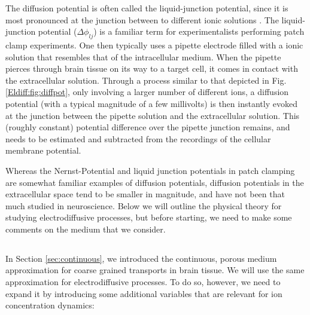 The diffusion potential is often called the liquid-junction potential, since it is most pronounced at the junction between to different ionic solutions \cite{Sokalski2001}. The liquid-junction potential ($\Delta \phi_{lj}$) is a familiar term for experimentalists performing patch clamp experiments. One then typically uses a pipette electrode filled with a ionic solution that resembles that of the intracellular medium. When the pipette pierces through brain tissue on its way to a target cell, it comes in contact with the extracellular solution. Through a process similar to that depicted in Fig. \ref{Eldiff:fig:diffpot}, only involving a larger number of different ions, a diffusion potential (with a typical magnitude of a few millivolts) is then instantly evoked at the junction between the pipette solution and the extracellular solution. This (roughly constant) potential difference over the pipette junction remains, and needs to be estimated and subtracted from the recordings of the cellular membrane potential.

Whereas the Nernst-Potential and liquid junction potentials in patch clamping are somewhat familiar examples of diffusion potentials, diffusion potentials in the extracellular space tend to be smaller in magnitude, and have not been that much studied in neuroscience. Below we will outline the physical theory for studying electrodiffusive processes, but before starting, we need to make some comments on the medium that we consider. 


\subsection{}
\label{sec:porous}
In Section \ref{sec:continuous}, we introduced the continuous, porous medium approximation for coarse grained transports in brain tissue. We will use the same approximation for electrodiffusive processes. To do so, however, we need to expand it by introducing some additional variables that are relevant for ion concentration dynamics:

